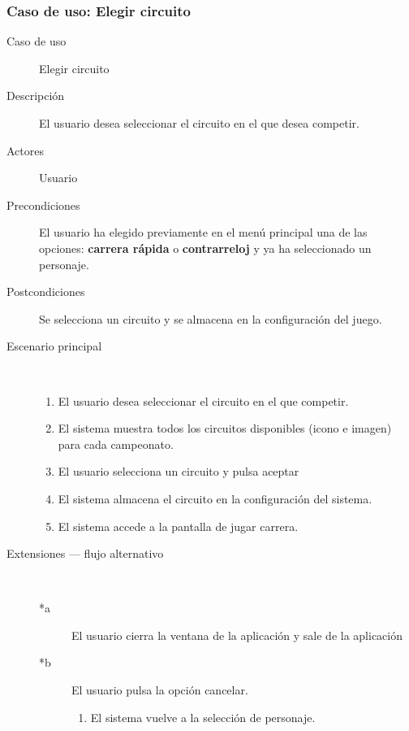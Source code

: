 \subsubsection{Caso de uso: Elegir circuito}

\begin{description}
    \item[Caso de uso] Elegir circuito
    \item[Descripción] El usuario desea seleccionar el circuito en el que desea competir.
    \item[Actores] Usuario
    \item[Precondiciones] El usuario ha elegido previamente en el menú principal una de las opciones: \textbf{carrera rápida} 
    o \textbf{contrarreloj} y ya ha seleccionado un personaje.
    
    \item[Postcondiciones] Se selecciona un circuito y se almacena en la configuración del juego.
    \item[Escenario principal] $\quad$
        \begin{enumerate}
            \item El usuario desea seleccionar el circuito en el que competir.
            \item El sistema muestra todos los circuitos disponibles (icono e imagen) para cada campeonato.
            \item El usuario selecciona un circuito y pulsa aceptar
            \item El sistema almacena el circuito en la configuración del sistema.
            \item El sistema accede a la pantalla de jugar carrera.
        \end{enumerate}
    \item[Extensiones --- flujo alternativo] $\quad$
        \begin{description}
            \item[*a ] El usuario cierra la ventana de la aplicación y sale de la aplicación
            \item[*b ] El usuario pulsa la opción cancelar.
            \begin{enumerate}
                \item El sistema vuelve a la selección de personaje.
            \end{enumerate}
        \end{description}
\end{description}


